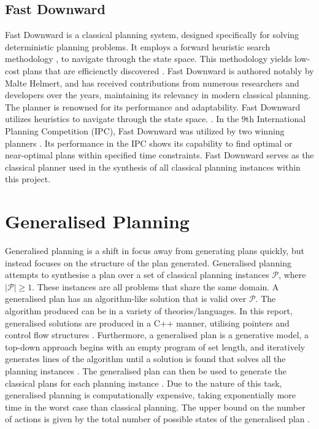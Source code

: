 \subsection{Fast Downward}
Fast Downward is a classical planning system, designed specifically for solving deterministic planning problems. It employs a forward heuristic search methodology \cite{heuristicplanning}, to navigate through the state space. This methodology yields low-cost plans that are efficienctly discovered \cite{helmert_fast_2006}.  Fast Downward is authored notably by Malte Helmert, and has received contributions from numerous researchers and developers over the years, maintaining its relevancy in modern classical planning. The planner is renowned for its performance and adaptability. Fast Downward utilizes heuristics to navigate through the state space. \cite{helmert_fast_2006}. In the 9th International Planning Competition (IPC), Fast Downward was utilized by two winning planners \cite{vie2022adversarial}. Its performance in the IPC shows its capability to find optimal or near-optimal plans within specified time constraints. Fast Downward serves as the classical planner used in the synthesis of all classical planning instances within this project.

\section{Generalised Planning}
Generalised planning is a shift in focus away from generating plans quickly, but instead focuses on the structure of the plan generated. Generalised planning attempts to synthesise a plan over a set of classical planning instances $\mathcal{P}$, where $|\mathcal{P}| \geq 1$. These instances are all problems that share the same domain. A generalised plan has an algorithm-like solution that is valid over $\mathcal{P}$. \cite{jimenez_review_2019} The algorithm produced can be in a variety of theories/languages. In this report, generalised solutions are produced in a C++ manner, utilising pointers and control flow structures \cite{segovia-aguas_representation_2022}. Furthermore, a generalised plan is a generative model, a top-down approach begins with an empty program of set length, and iteratively generates lines of the algorithm until a solution is found that solves all the planning instances \cite{jimenez_review_2019}. The generalised plan can then be used to generate the classical plans for each planning instance \cite{jimenez_review_2019}. Due to the nature of this task, generalised planning is computationally expensive, taking exponentially more time in the worst case than classical planning. The upper bound on the number of actions is given by the total number of possible states of the generalised plan \cite{backstrom_automaton_plans}. 

